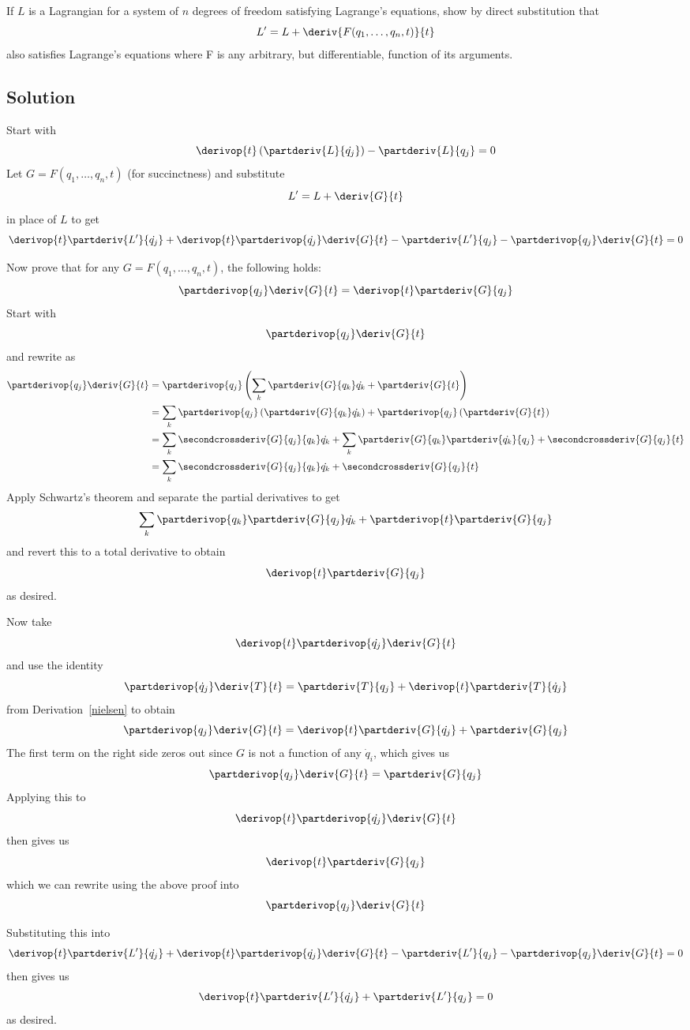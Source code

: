 If $L$ is a Lagrangian for a system of $n$ degrees of freedom
satisfying Lagrange's equations, show by direct substitution that
\[ L' = L + \deriv{F(q_1,\ldots,q_n, t)}{t}\]
also satisfies Lagrange's equations where F is any arbitrary, but
differentiable, function of its arguments.

\subsection*{Solution}
Start with
\[\derivop{t}\left(\partderiv{L}{\dot{q_j}}\right) - \partderiv{L}{q_j} = 0\]
Let $G = F(q_1,\ldots,q_n, t)$ (for succinctness)
and substitute
\[ L' = L + \deriv{G}{t}\]
in place of $L$ to get
\[
\derivop{t}\partderiv{L'}{\dot{q_j}} +
\derivop{t}\partderivop{\dot{q_j}}\deriv{G}{t} -
\partderiv{L'}{q_j} -
\partderivop{q_j}\deriv{G}{t} = 0
\]

Now prove that for any $G = F(q_1,\ldots,q_n, t)$, the following holds:
\[\partderivop{q_j}\deriv{G}{t} = \derivop{t}\partderiv{G}{q_j} \]
Start with
\[ \partderivop{q_j}\deriv{G}{t} \]
and rewrite as
\begin{align*}
  \partderivop{q_j}\deriv{G}{t}
  &=
  \partderivop{q_j}\left(\sum_k\partderiv{G}{q_k}\dot{q_k} +
  \partderiv{G}{t}\right) \\
  &=
  \sum_k\partderivop{q_j}\left(\partderiv{G}{q_k}\dot{q_k}\right) +
  \partderivop{q_j}\left(\partderiv{G}{t}\right) \\
  &=
  \sum_k\secondcrossderiv{G}{q_j}{q_k}\dot{q_k} +
  \sum_k\partderiv{G}{q_k}\partderiv{\dot{q_k}}{q_j} +
  \secondcrossderiv{G}{q_j}{t} \\
  &=
  \sum_k\secondcrossderiv{G}{q_j}{q_k}\dot{q_k} +
  \secondcrossderiv{G}{q_j}{t}
\end{align*}
Apply Schwartz's theorem and separate the partial derivatives to get
\[
\sum_k\partderivop{q_k}\partderiv{G}{q_j}\dot{q_k} +
\partderivop{t}\partderiv{G}{q_j}
\]
and revert this to a total derivative to obtain
\[ \derivop{t}\partderiv{G}{q_j} \]
as desired.

Now take
\[ \derivop{t}\partderivop{\dot{q_j}}\deriv{G}{t} \]
and use the identity
\[
\partderivop{\dot{q}_j}\deriv{T}{t}
=
\partderiv{T}{q_j}
+\derivop{t}\partderiv{T}{\dot{q}_j}
\]
from Derivation~\ref{nielsen} to obtain
\[
\partderivop{q_j}\deriv{G}{t}
=
\derivop{t}\partderiv{G}{\dot{q_j}} + \partderiv{G}{q_j}
\]
The first term on the right side zeros out since $G$ is not a function
of any $\dot{q}_i$, which gives us
\[ \partderivop{q_j}\deriv{G}{t} = \partderiv{G}{q_j}\]
Applying this to
\[ \derivop{t}\partderivop{\dot{q_j}}\deriv{G}{t} \]
then gives us
\[ \derivop{t}\partderiv{G}{q_j} \]
which we can rewrite using the above proof into
\[ \partderivop{q_j}\deriv{G}{t} \]

Substituting this into
\[
\derivop{t}\partderiv{L'}{\dot{q_j}} +
\derivop{t}\partderivop{\dot{q_j}}\deriv{G}{t} -
\partderiv{L'}{q_j} -
\partderivop{q_j}\deriv{G}{t} = 0
\]
then gives us
\[
\derivop{t}\partderiv{L'}{\dot{q_j}} +
\partderiv{L'}{q_j} = 0
\]
as desired.
